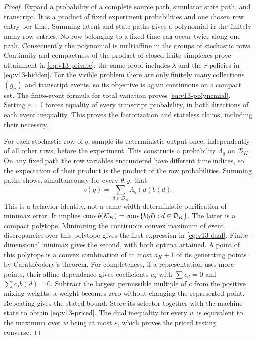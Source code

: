 \begin{proof}
Expand a probability of a complete source path, simulator state path,
and transcript. It is a product of fixed experiment probabilities and
one chosen row entry per time. Summing latent and state paths gives a
polynomial in the finitely many row entries. No row belonging to a fixed
time can occur twice along one path. Consequently the polynomial is
multiaffine in the groups of stochastic rows. Continuity and compactness
of the product of closed finite simplexes prove attainment in
\eqref{eq:v13-private}; the same proof includes $\lambda$ and the $r$
policies in \eqref{eq:v13-hidden}. For the visible problem there are only
finitely many collections $(g_u)$ and transcript events, so its objective
is again continuous on a compact set. The finite-event formula for total
variation proves \eqref{eq:v13-polynomial}. Setting $\varepsilon=0$
forces equality of every transcript probability, in both directions of
each event inequality. This proves the factorization and stateless
claims, including their necessity.

For each stochastic row of $q$, sample its deterministic output once,
independently of all other rows, before the experiment. This constructs
a probability $\Lambda_q$ on $\mathcal D_K$. On any fixed path the row
variables encountered have different time indices, so the expectation
of their product is the product of the row probabilities. Summing paths
shows, simultaneously for every $\theta,g$, that
\begin{equation}\label{eq:v13-purification}
 b(q)=\sum_{d\in\mathcal D_K}\Lambda_q(d)b(d).
\end{equation}
This is a behavior identity, not a same-width deterministic
purification of minimax error. It implies
$\operatorname{conv} b(\mathcal K_K)=\operatorname{conv}\{b(d):d\in\mathcal D_K\}$.
The latter is a compact polytope. Minimizing the continuous convex
maximum of event discrepancies over this polytope gives the first
expression in \eqref{eq:v13-dual}. Finite-dimensional minimax gives the
second, with both optima attained. A point of this polytope is a convex
combination of at most $a_K+1$ of its generating points by
Carath\'eodory's theorem. For completeness, if a representation uses more
points, their affine dependence gives coefficients $c_d$ with
$\sum c_d=0$ and $\sum c_db(d)=0$. Subtract the largest permissible
multiple of $c$ from the positive mixing weights; a weight becomes zero
without changing the represented point. Repeating gives the stated
bound. Store its selector together with the machine state to obtain
\eqref{eq:v13-priced}. The dual inequality for every $w$ is equivalent
to the maximum over $w$ being at most $\varepsilon$, which proves the
priced testing converse.


\end{proof}
